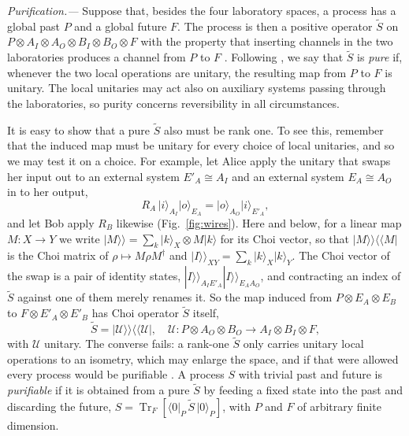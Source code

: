 \documentclass[aps,prl,reprint,superscriptaddress,nofootinbib,longbibliography,raggedbottom]{revtex4-2}
\DeclareMathOperator{\Tr}{Tr}
\newcommand{\ket}[1]{\lvert #1\rangle}
\newcommand{\bra}[1]{\langle #1\rvert}
\begin{document}
\textit{Purification.---}%
Suppose that, besides the four laboratory spaces, a process has a global
past $P$ and a global future $F$. The process is then a positive operator $\widetilde S$ on
$P\otimes A_I\otimes A_O\otimes B_I\otimes B_O\otimes F$ with the property
that inserting channels in the two laboratories produces a channel from $P$
to $F$ \cite{CDP,AFNB}. Following \cite{AFNB}, we say that $\widetilde S$ is \emph{pure} if,
whenever the two local operations are unitary, the resulting map from $P$
to $F$ is unitary. The local unitaries may act also on auxiliary systems
passing through the laboratories, so purity concerns reversibility in all
circumstances. 

It is easy to show that a pure $\widetilde S$ also must be rank one. To see this, remember that the induced map
must be unitary for every choice of local unitaries, and so we may test it on a
choice. For example, let Alice apply the unitary that swaps her input
out to an external system $E'_A\cong A_I$ and an external system
$E_A\cong A_O$ in to her output,
\begin{equation}\label{swap}
R_A\,\ket i_{A_I}\ket o_{E_A}=\ket o_{A_O}\ket i_{E'_A},
\end{equation}
and let Bob apply $R_B$ likewise (Fig.~\ref{fig:wires}). Here and below,
for a linear map
$M\colon X\to Y$ we write $|M\rangle\!\rangle=\sum_k\ket k_X\otimes M\ket k$
for its Choi vector, so that $|M\rangle\!\rangle\langle\!\langle M|$ is the
Choi matrix of $\rho\mapsto M\rho M^\dagger$ and
$|I\rangle\!\rangle_{XY}=\sum_k\ket k_X\ket k_Y$. The Choi vector of the
swap is a pair of identity states,
$|I\rangle\!\rangle_{A_IE'_A}|I\rangle\!\rangle_{E_AA_O}$, and contracting
an index of $\widetilde S$ against one of them merely renames it. So the map induced from
$P\otimes E_A\otimes E_B$ to $F\otimes E'_A\otimes E'_B$ has Choi operator
$\widetilde S$ itself,
\begin{equation}\label{rankone}
\widetilde S=|\mathcal U\rangle\!\rangle\langle\!\langle\mathcal U|,\quad
\mathcal U\colon P\otimes A_O\otimes B_O\to A_I\otimes B_I\otimes F,
\end{equation}
with $\mathcal U$ unitary. The converse fails: a rank-one $\widetilde S$ only carries
unitary local operations to an isometry, which may enlarge the space, and
if that were allowed every process would be purifiable \cite{AFNB}. A
process $S$ with trivial past and future is \emph{purifiable} if it is
obtained
from a pure $\widetilde S$ by feeding a fixed state into the past and discarding the
future, $S=\Tr_F[\bra0_P\,\widetilde S\,\ket0_P]$, with $P$ and $F$ of arbitrary
finite dimension.
\end{document}
